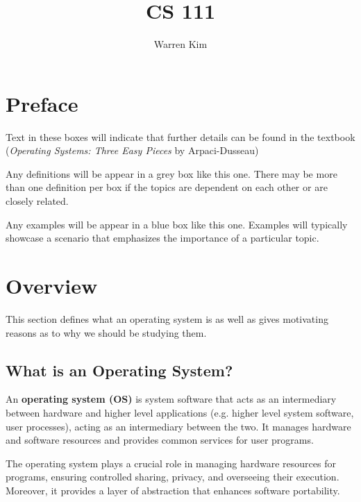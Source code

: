 \documentclass{article}
\title{CS 111}
\author{Warren Kim}
\begin{document}
\maketitle

\tableofcontents
\newpage

\section{Preface}
\begin{tcolorbox}[colback=black!5!white,colframe=black!75!black,title=\textit{Operating Systems: Three Easy Pieces}]
  Text in these boxes will indicate that further details can be found in the textbook
  (\textit{Operating Systems: Three Easy Pieces} by Arpaci-Dusseau)
\end{tcolorbox}

\begin{tcolorbox}[title=Definitions]
  Any definitions will be appear in a grey box like this one. There may be more than one definition
  per box if the topics are dependent on each other or are closely related.
\end{tcolorbox}

\begin{tcolorbox}[colback=blue!5!white,colframe=black!75!blue,title=Examples]
  Any examples will be appear in a blue box like this one. Examples will typically showcase a scenario
  that emphasizes the importance of a particular topic. 
\end{tcolorbox}




\newpage
\section{Overview}
This section defines what an operating system is as well as gives motivating reasons as to why we
should be studying them. 


\subsection{What is an Operating System?}
\begin{tcolorbox}[title=Definition: Operating System]
  An \textbf{operating system (OS)} is system software that acts as an intermediary between hardware and
  higher level applications (e.g. higher level system software, user processes), acting as an
  intermediary between the two. It manages hardware and software resources and provides common
  services for user programs. 
\end{tcolorbox}
The operating system plays a crucial role in managing hardware resources for programs, ensuring
controlled sharing, privacy, and overseeing their execution. Moreover, it provides a layer of
abstraction that enhances software portability. 
\end{document}
